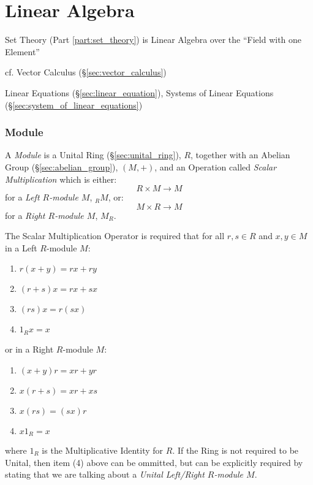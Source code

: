 \part{Linear Algebra}\label{part:linear_algebra}

Set Theory (Part \ref{part:set_theory}) is Linear Algebra over the
``Field with one Element''

cf. Vector Calculus (\S\ref{sec:vector_calculus})

\fist Linear Equations (\S\ref{sec:linear_equation}), Systems of Linear
Equations (\S\ref{sec:system_of_linear_equations})



\section{Module}\label{sec:module}

A \emph{Module} is a Unital Ring (\S\ref{sec:unital_ring}), $R$,
together with an Abelian Group (\S\ref{sec:abelian_group}), $(M, +)$,
and an Operation called \emph{Scalar Multiplication} which is either:
\[ R \times M \rightarrow M \]
for a \emph{Left $R$-module $M$}, $_R M$, or:
\[ M \times R \rightarrow M \]
for a \emph{Right $R$-module $M$}, $M_R$.

The Scalar Multiplication Operator is required that for all $r,s \in
R$ and $x,y \in M$ in a Left $R$-module $M$:
\begin{enumerate}
    \item $r(x + y) = rx + ry$
    \item $(r + s)x = rx + sx$
    \item $(rs)x = r(sx)$
    \item $1_Rx = x$
\end{enumerate}
or in a Right $R$-module $M$:
\begin{enumerate}
    \item $(x + y)r = xr + yr$
    \item $x(r + s) = xr + xs$
    \item $x(rs) = (sx)r$
    \item $x 1_R = x$
\end{enumerate}
where $1_R$ is the Multiplicative Identity for $R$. If the Ring is not
required to be Unital, then item (4) above can be ommitted, but can be
explicitly required by stating that we are talking about a
\emph{Unital Left/Right $R$-module $M$}.

